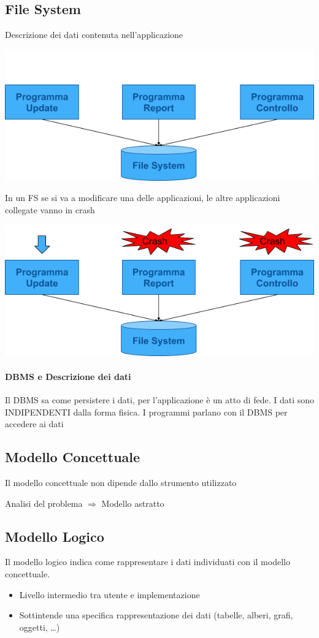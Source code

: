 \documentclass[12pt,a4paper]{article}
\begin{document}
\subsection{File System}
Descrizione dei dati contenuta nell'applicazione
\begin{center}
\includegraphics[width=0.6\columnwidth]{img/file_system.png}
\end{center}
In un FS se si va a modificare una delle applicazioni, le altre applicazioni collegate vanno in crash
\begin{center}
\includegraphics[width=0.6\columnwidth]{img/file_system2.png}
\end{center}

\paragraph{DBMS e Descrizione dei dati\\}
Il DBMS sa come persistere i dati, per l’applicazione è un atto di fede. I dati sono INDIPENDENTI dalla forma fisica. I programmi parlano con il DBMS per accedere ai dati

\subsection{Modello Concettuale}
Il modello concettuale non dipende dallo strumento utilizzato\\
\begin{center}Analisi del problema $\Longrightarrow$ Modello astratto\end{center}

\subsection{Modello Logico}
Il modello logico indica come rappresentare i dati individuati con il modello concettuale. 
\begin{itemize}
\item Livello intermedio tra utente e implementazione
\item Sottintende una specifica rappresentazione dei dati (tabelle, alberi, grafi, oggetti, …)
\end{itemize}
\end{document}
